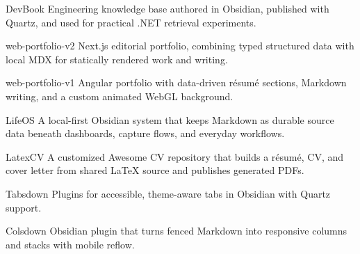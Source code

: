 

\begin{cvprojects}

  \cvproject
    {DevBook}
    {Engineering knowledge base authored in Obsidian, published with Quartz, and used for practical .NET retrieval experiments.}

  \cvproject
    {web-portfolio-v2}
    {Next.js editorial portfolio, combining typed structured data with local MDX for statically rendered work and writing.}

  \cvproject
    {web-portfolio-v1}
    {Angular portfolio with data-driven résumé sections, Markdown writing, and a custom animated WebGL background.}

  \cvproject
    {LifeOS}
    {A local-first Obsidian system that keeps Markdown as durable source data beneath dashboards, capture flows, and everyday workflows.}

  \cvproject
    {LatexCV}
    {A customized Awesome CV repository that builds a résumé, CV, and cover letter from shared LaTeX source and publishes generated PDFs.}

  \cvproject
    {Tabsdown}
    {Plugins for accessible, theme-aware tabs in Obsidian with Quartz support.}

  \cvproject
    {Colsdown}
    {Obsidian plugin that turns fenced Markdown into responsive columns and stacks with mobile reflow.}

\end{cvprojects}
